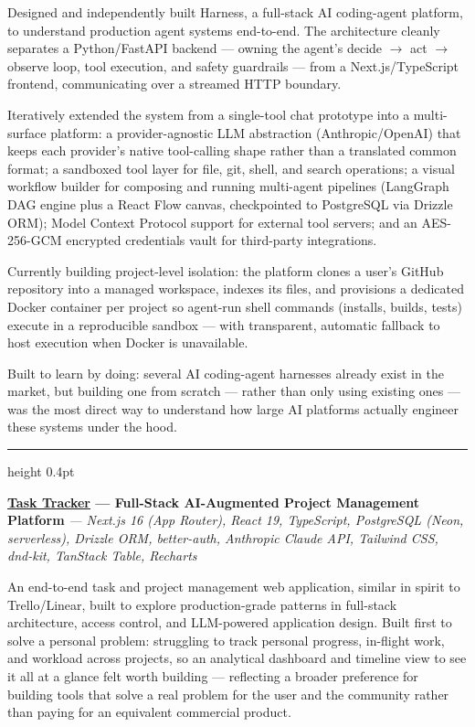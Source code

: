 \documentclass[a4paper,10pt]{article}
\newcommand{\projectdivider}{\vspace{4pt}\textcolor{dividercolor}{\hrule height 0.4pt}\vspace{4pt}}
\newcommand{\projecttitle}[2]{\noindent\textbf{#1} \textit{#2}\par\vspace{1pt}}
\begin{document}
Designed and independently built Harness, a full-stack AI coding-agent platform, to understand production agent systems end-to-end. The architecture cleanly separates a Python/FastAPI backend --- owning the agent's decide $\rightarrow$ act $\rightarrow$ observe loop, tool execution, and safety guardrails --- from a Next.js/TypeScript frontend, communicating over a streamed HTTP boundary.

Iteratively extended the system from a single-tool chat prototype into a multi-surface platform: a provider-agnostic LLM abstraction (Anthropic/OpenAI) that keeps each provider's native tool-calling shape rather than a translated common format; a sandboxed tool layer for file, git, shell, and search operations; a visual workflow builder for composing and running multi-agent pipelines (LangGraph DAG engine plus a React Flow canvas, checkpointed to PostgreSQL via Drizzle ORM); Model Context Protocol support for external tool servers; and an AES-256-GCM encrypted credentials vault for third-party integrations.

Currently building project-level isolation: the platform clones a user's GitHub repository into a managed workspace, indexes its files, and provisions a dedicated Docker container per project so agent-run shell commands (installs, builds, tests) execute in a reproducible sandbox --- with transparent, automatic fallback to host execution when Docker is unavailable.

Built to learn by doing: several AI coding-agent harnesses already exist in the market, but building one from scratch --- rather than only using existing ones --- was the most direct way to understand how large AI platforms actually engineer these systems under the hood.

\projectdivider

\projecttitle{\href{https://task-tracker-gray-mu.vercel.app/}{Task Tracker} --- Full-Stack AI-Augmented Project Management Platform}{--- Next.js 16 (App Router), React 19, TypeScript, PostgreSQL (Neon, serverless), Drizzle ORM, better-auth, Anthropic Claude API, Tailwind CSS, dnd-kit, TanStack Table, Recharts}

An end-to-end task and project management web application, similar in spirit to Trello/Linear, built to explore production-grade patterns in full-stack architecture, access control, and LLM-powered application design. Built first to solve a personal problem: struggling to track personal progress, in-flight work, and workload across projects, so an analytical dashboard and timeline view to see it all at a glance felt worth building --- reflecting a broader preference for building tools that solve a real problem for the user and the community rather than paying for an equivalent commercial product.
\end{document}
